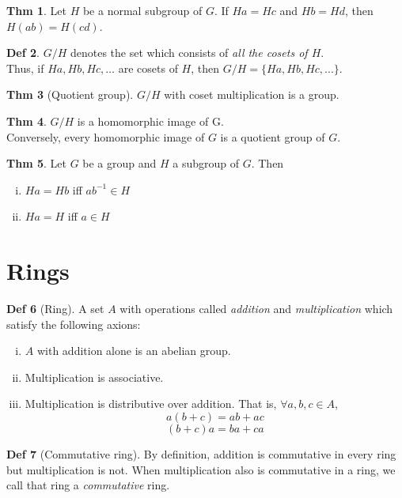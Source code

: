 \documentclass{article}
\theoremstyle{definition}
\newtheorem{definition}{Def}[section]
\newtheorem{theorem}[definition]{Thm}
\begin{document}
\begin{theorem}
    Let $H$ be a normal subgroup of $G$. If $Ha = Hc$ and $Hb = Hd$, then $H(ab) = H(cd)$.
\end{theorem}

\begin{definition}
    $G/H$ denotes the set which consists of \emph{all the cosets of $H$}.
    \\
    Thus, if $Ha, Hb, Hc, \ldots$ are cosets of $H$, then $G/H = \{ Ha, Hb, Hc, ... \}$.
\end{definition}

\begin{theorem}[Quotient group]
    $G/H$ with coset multiplication is a group.
\end{theorem}

\begin{theorem}
    $G/H$ is a homomorphic image of G.
    \\
    Conversely, every homomorphic image of $G$ is a quotient group of $G$.
\end{theorem}

\begin{theorem}
    Let $G$ be a group and $H$ a subgroup of $G$. Then
    \begin{enumerate}[i.]
	\item $Ha = Hb$ iff ${ab}^{-1} \in H$
	\item $Ha = H$ iff $a \in H$
    \end{enumerate}
\end{theorem}


\section{Rings}

\begin{definition}[Ring]
    A set $A$ with operations called \emph{addition} and \emph{multiplication} which satisfy the following axions:
    \begin{enumerate}[i.]
	\item $A$ with addition alone is an abelian group.
	\item Multiplication is associative.
	\item Multiplication is distributive over addition. That is, $\forall a,b,c \in A$,
	    $$a(b+c) = ab + ac$$
	    $$(b+c)a = ba + ca$$
    \end{enumerate}
\end{definition}

\begin{definition}[Commutative ring]
    By definition, addition is commutative in every ring but multiplication is not. When multiplication also is commutative in a ring, we call that ring a \emph{commutative} ring.
\end{definition}
\end{document}
